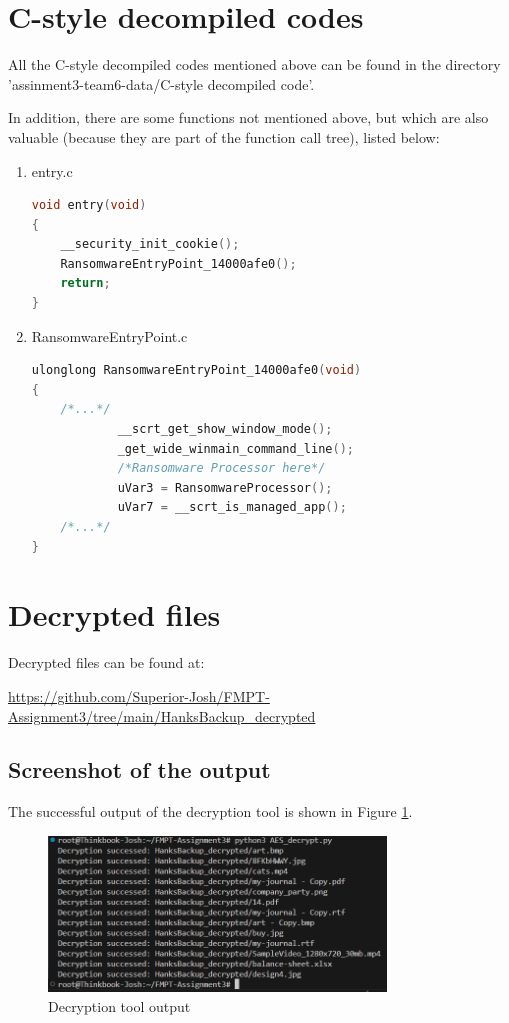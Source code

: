 \documentclass[11pt]{article}
\begin{document}
\section{C-style decompiled codes}
All the C-style decompiled codes mentioned above can be found in the
directory\\'assinment3-team6-data/C-style decompiled code'.

In addition, there are some functions not mentioned above, but which are also
valuable (because they are part of the function call tree), listed below:

\begin{enumerate}
    \item entry.c \begin{lstlisting}[language=C++, caption=entry.c]
void entry(void)
{
    __security_init_cookie();
    RansomwareEntryPoint_14000afe0();
    return;
}
\end{lstlisting}

    \item RansomwareEntryPoint.c \begin{lstlisting}[language=C++, caption=RansomwareEntryPoint\_14000afe0.c]
ulonglong RansomwareEntryPoint_14000afe0(void)
{
    /*...*/
            __scrt_get_show_window_mode();
            _get_wide_winmain_command_line();
            /*Ransomware Processor here*/
            uVar3 = RansomwareProcessor();
            uVar7 = __scrt_is_managed_app();
    /*...*/
}
\end{lstlisting}

\end{enumerate}

\section{Decrypted files}
Decrypted files can be found at:

\url{https://github.com/Superior-Josh/FMPT-Assignment3/tree/main/HanksBackup_decrypted}

\subsection{Screenshot of the output}
The successful output of the decryption tool is shown in Figure \ref{fig:output}.
\begin{figure}[htbp]
    \centering
    \includegraphics[width=0.8\textwidth]{img/output.png}
    \caption{Decryption tool output}
    \label{fig:output}
\end{figure}
\end{document}
